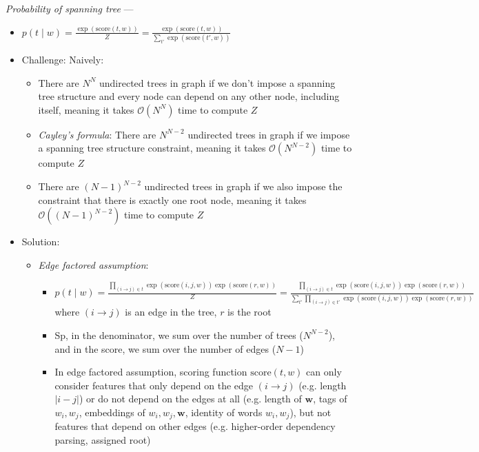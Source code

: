 \emph{Probability of spanning tree} ---
\begin{itemize}
    \item 
    $
    p(t \mid w) = \frac{\exp(\textrm{score}(t, w))}{Z} = \frac{\exp(\textrm{score}(t, w))}{\sum_{t'} \exp(\textrm{score}(t', w))}
    $
    \item Challenge: Naively:
    \begin{itemize}
        \item There are $N^N$ undirected trees in graph if we don't impose a spanning tree structure and every node can depend on any other node, including itself, meaning it takes $\mathcal{O}(N^N)$ time to compute $Z$ 
        \item \emph{Cayley's formula}: There are $N^{N-2}$ undirected trees in graph if we impose a spanning tree structure constraint, meaning it takes $\mathcal{O}(N^{N-2})$ time to compute $Z$
        \item There are $(N-1)^{N-2}$ undirected trees in graph if we also impose the constraint that there is exactly one root node, meaning it takes  $\mathcal{O}((N-1)^{N-2})$ time to compute $Z$
    \end{itemize}
    \item Solution: 
    \begin{itemize}
        \item \emph{Edge factored assumption}:
        \begin{itemize}
            \item $
            p(t \mid w) = \frac{\prod_{(i \to j) \in t} \exp(\textrm{score}(i, j, w)) \exp(\textrm{score}(r, w))}{Z} = \frac{\prod_{(i \to j) \in t} \exp(\textrm{score}(i, j, w)) \exp(\textrm{score}(r, w))}{\sum_{t'} \prod_{(i \to j) \in t'} \exp(\textrm{score}(i, j, w)) \exp(\textrm{score}(r, w))}
            $ where $(i \to j)$ is an edge in the tree, $r$ is the root 
            \item Sp, in the denominator, we sum over the number of trees ($N^{N-2}$), and in the score, we sum over the number of edges ($N-1$)
            \item In edge factored assumption, scoring function $\textrm{score}(t, w)$ can only consider features that only depend on the edge $(i \to j)$ (e.g. length $|i-j|$) or do not depend on the edges at all (e.g. length of $\boldsymbol{w}$, tags of $w_i, w_j$, embeddings of $w_i, w_j, \boldsymbol{w}$, identity of words $w_i, w_j$), but not features that depend on other edges (e.g. higher-order dependency parsing, assigned root)
        \end{itemize}

\end{itemize}
\end{itemize}
